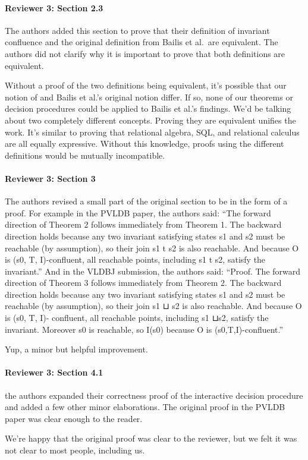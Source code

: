 \documentclass[9pt]{article}
\begin{document}
\begin{multicols*}{2}
\paragraph{Reviewer 3: Section 2.3}
\begin{feedback}
  The authors added this section to prove that their definition of invariant
  confluence and the original definition from Bailis et al.\ are equivalent.
  The authors did not clarify why it is important to prove that both
  definitions are equivalent.
\end{feedback}
Without a proof of the two definitions being equivalent, it's possible that our
notion of \invariantconfluence{} and Bailis et al.'s original notion differ.
If so, none of our theorems or decision procedures could be applied to Bailis et
al.'s findings. We'd be talking about two completely different concepts.
Proving they are equivalent unifies the work. It's similar to proving that
relational algebra, SQL, and relational calculus are all equally expressive.
Without this knowledge, proofs using the different definitions would be
mutually incompatible.

\paragraph{Reviewer 3: Section 3}
\begin{feedback}
  The authors revised a small part of the original section to be in the form of
  a proof. For example in the PVLDB paper, the authors said: ``The forward
  direction of Theorem 2 follows immediately from Theorem 1. The backward
  direction holds because any two invariant satisfying states s1 and s2 must be
  reachable (by assumption), so their join s1 t s2 is also reachable. And
  because O is (s0, T, I)-confluent, all reachable points, including s1 t s2,
  satisfy the invariant.'' And in the VLDBJ submission, the authors said:
  ``Proof. The forward direction of Theorem 3 follows immediately from Theorem
  2. The backward direction holds because any two invariant satisfying states
  s1 and s2 must be reachable (by assumption), so their join s1 ⊔ s2 is also
  reachable. And because O is (s0, T, I)- confluent, all reachable points,
  including s1 ⊔s2, satisfy the invariant. Moreover s0 is reachable, so I(s0)
  because O is (s0,T,I)-confluent.''
\end{feedback}
Yup, a minor but helpful improvement.

\paragraph{Reviewer 3: Section 4.1}
\begin{feedback}
  the authors expanded their correctness proof of the interactive decision
  procedure and added a few other minor elaborations. The original proof in the
  PVLDB paper was clear enough to the reader.
\end{feedback}
We're happy that the original proof was clear to the reviewer, but we felt it
was not clear to most people, including us.


\end{multicols*}
\end{document}
